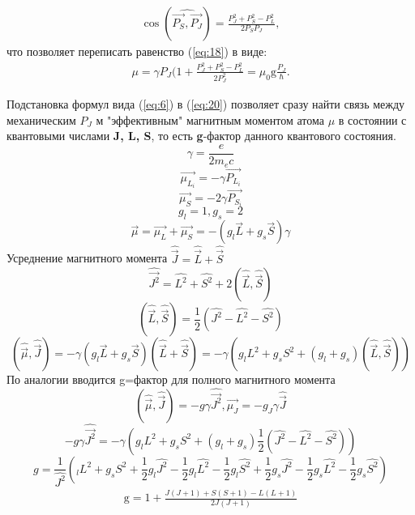 \begin{gather} 
\label{eq:19b} 
\cos(\widehat{\vec{P_S},\vec{P_J}})=\frac{P_J^2+P_S^2-P_L^2}{2P_S P_J},
\end{gather}
что позволяет переписать равенство (\ref{eq:18}) в виде:
\begin{gather} 
\label{eq:20} 
\mu=\gamma P_J(1+\frac{P_J^2+P_S^2-P_L^2}{2P_J^2}=\mu_0 \text{g} \frac{P_J}{\hbar}.
\end{gather}
 
 Подстановка формул вида (\ref{eq:6}) в (\ref{eq:20}) позволяет сразу найти связь между механическим $P_J$ м "эффективным" магнитным моментом атома $\mu$ в состоянии с квантовыми числами \textbf{J, L, S}, то есть \textbf{g}-фактор данного квантового состояния.
$$\gamma=\frac{e}{2m_ec}$$
$$\vec{\mu_{L_i}} = -\gamma \vec{P_{L_i}}$$
$$\vec{\mu_{S}} = -2\gamma \vec{P_{S_i}}$$
$$g_l=1, g_s=2$$
$$\vec{\mu}=\vec{\mu_{L}}+\vec{\mu_{S}}=-(g_l\vec{L}+g_s\vec{S})\gamma$$
Усреднение магнитного момента $\widehat{\vec{J}}=\widehat{\vec{L}}+\widehat{\vec{S}}$
$$\widehat{\vec{J^2}}=\widehat{L^2}+\widehat{S^2}+2(\widehat{\vec{L}},\widehat{\vec{S}})$$
$$(\widehat{\vec{L}},\widehat{\vec{S}})=\frac12(\widehat{J^2}-\widehat{L^2}-\widehat{S^2})$$
$$(\widehat{\vec{\mu}},\widehat{\vec{J}})=-\gamma(g_l\vec{L}+g_s\vec{S})(\widehat{\vec{L}}+\widehat{\vec{S}})=-\gamma(g_l{L^2}+g_s{S^2}+(g_l+g_s)(\widehat{\vec{L}},\widehat{\vec{S}}))$$
По аналогии вводится g=фактор для полного магнитного момента
$$(\widehat{\vec{\mu}},\widehat{\vec{J}})=-g\gamma\widehat{\vec{J^2}}, \vec{\mu_J}=-g_J\gamma\widehat{\vec{J}} $$
$$-g\gamma\widehat{\vec{J^2}}=-\gamma(g_l{L^2}+g_s{S^2}+(g_l+g_s)\frac12(\widehat{J^2}-\widehat{L^2}-\widehat{S^2}))$$
$$g=\frac{1}{\widehat{J^2}}(_l{L^2}+g_s{S^2}+\frac12g_l\widehat{J^2}-\frac12g_l\widehat{L^2}-\frac12g_l\widehat{S^2}+\frac12g_s\widehat{J^2}-\frac12g_s\widehat{L^2}-\frac12g_s\widehat{S^2})$$
\begin{gather} 
\label{eq:21} 
\text{g}=1+\frac{J(J+1)+S(S+1)-L(L+1)}{2J(J+1)}
\end{gather}